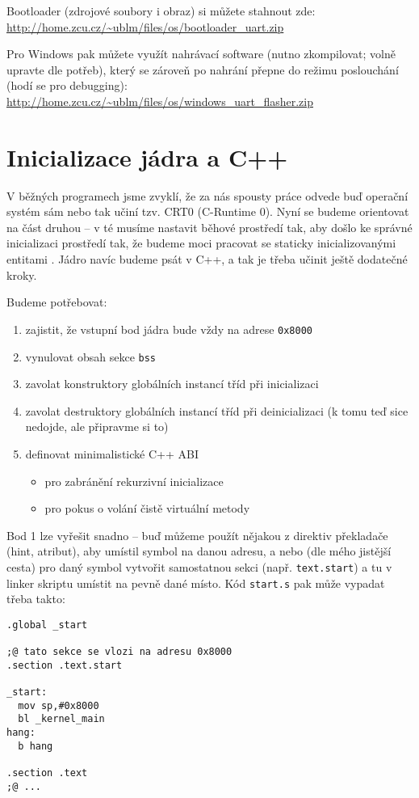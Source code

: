 \documentclass{article}
\begin{document}
Bootloader (zdrojové soubory i obraz) si můžete stahnout zde: \url{http://home.zcu.cz/~ublm/files/os/bootloader_uart.zip}

Pro Windows pak můžete využít nahrávací software (nutno zkompilovat; volně upravte dle potřeb), který se zároveň po nahrání přepne do režimu poslouchání (hodí se pro debugging): \url{http://home.zcu.cz/~ublm/files/os/windows_uart_flasher.zip}

\section{Inicializace jádra a C++}

V běžných programech jsme zvyklí, že za nás spousty práce odvede buď operační systém sám nebo tak učiní tzv. CRT0 (C-Runtime 0). Nyní se budeme orientovat na část druhou -- v té musíme nastavit běhové prostředí tak, aby došlo ke správné inicializaci prostředí tak, že budeme moci pracovat se staticky inicializovanými entitami . Jádro navíc budeme psát v C++, a tak je třeba učinit ještě dodatečné kroky.

Budeme potřebovat:
\begin{enumerate}
	\item zajistit, že vstupní bod jádra bude vždy na adrese \texttt{0x8000}
	\item vynulovat obsah sekce \texttt{bss}
	\item zavolat konstruktory globálních instancí tříd při inicializaci
	\item zavolat destruktory globálních instancí tříd při deinicializaci (k tomu teď sice nedojde, ale připravme si to)
	\item definovat minimalistické C++ ABI
		\begin{itemize}
			\item pro zabránění rekurzivní inicializace
			\item pro pokus o volání čistě virtuální metody
		\end{itemize}
\end{enumerate}

Bod 1 lze vyřešit snadno -- buď můžeme použít nějakou z direktiv překladače (hint, atribut), aby umístil symbol na danou adresu, a nebo (dle mého jistější cesta) pro daný symbol vytvořit samostatnou sekci (např. \texttt{text.start}) a tu v linker skriptu umístit na pevně dané místo. Kód \texttt{start.s} pak může vypadat třeba takto:

\begin{lstlisting}
.global _start

;@ tato sekce se vlozi na adresu 0x8000
.section .text.start

_start:
  mov sp,#0x8000
  bl _kernel_main
hang:
  b hang

.section .text
;@ ...

\end{lstlisting}
\end{document}
